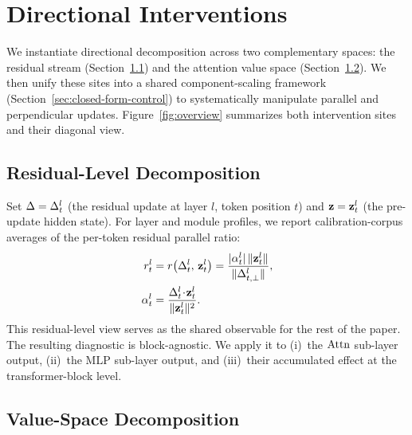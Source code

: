 \section{Directional Interventions}
\label{sec:method}

We instantiate directional decomposition across two complementary spaces: the
residual stream (Section~\ref{sec:residual-level}) and the attention value space
(Section~\ref{sec:value-level}). We then unify these sites into a shared
component-scaling framework (Section~\ref{sec:closed-form-control}) to systematically
manipulate parallel and perpendicular updates. Figure~\ref{fig:overview}
summarizes both intervention sites and their diagonal view.

\subsection{Residual-Level Decomposition}
\label{sec:residual-level}

Set $\Delta = \Delta^{l}_{t}$ (the residual update at layer $l$, token position $t$)
and $\mathbf{z} = \mathbf{z}^{l}_{t}$ (the pre-update hidden state).
For layer and module profiles, we report calibration-corpus averages of the
per-token residual parallel ratio:
\begin{equation}
  \begin{aligned}
  r^{l}_{t}
    &= r\!\left(\Delta^{l}_{t},\,\mathbf{z}^{l}_{t}\right)
     = \frac{|\alpha^l_t|\,\|\mathbf{z}^{l}_{t}\|}{\|\Delta^{l}_{t,\perp}\|},\\
  \alpha^l_t
    &= \frac{\Delta^{l}_{t}\!\cdot\!\mathbf{z}^{l}_{t}}{\|\mathbf{z}^{l}_{t}\|^2}.
  \end{aligned}
  \label{eq:para-ratio}
\end{equation}
This residual-level view serves as the shared observable for the rest of the
paper. The resulting diagnostic is block-agnostic. We apply it to
(i)~the $\mathrm{Attn}$ sub-layer output,
(ii)~the $\mathrm{MLP}$ sub-layer output, and
(iii)~their accumulated effect at the transformer-block level.

\subsection{Value-Space Decomposition}
\label{sec:value-level}

